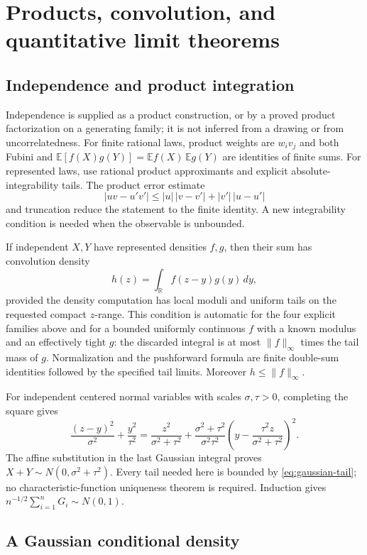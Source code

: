 \section{Products, convolution, and quantitative limit theorems}
\label{sec:limit-theorems}

\subsection{Independence and product integration}

Independence is supplied as a product construction, or by a proved product
factorization on a generating family; it is not inferred from a drawing or
from uncorrelatedness.  For finite rational laws, product weights are
$w_i v_j$ and both Fubini and
$\mathbb E[f(X)g(Y)]=\mathbb E f(X)\,\mathbb E g(Y)$ are identities of
finite sums.  For represented laws, use rational product approximants and
explicit absolute-integrability tails.  The product error estimate
\[
 |uv-u'v'|\leq |u|\,|v-v'|+|v'|\,|u-u'|
\]
and truncation reduce the statement to the finite identity.  A new
integrability condition is needed when the observable is unbounded.

If independent $X,Y$ have represented densities $f,g$, then their sum has
convolution density
\[
 h(z)=\int_{\mathbb R}f(z-y)g(y)\,dy,
\]
provided the density computation has local moduli and uniform tails on the
requested compact $z$-range.  This condition is automatic for the four
explicit families above and for a bounded uniformly continuous $f$ with a
known modulus and an effectively tight $g$: the discarded integral is at
most $\|f\|_\infty$ times the tail mass of $g$.  Normalization and the
pushforward formula are finite double-sum identities followed by the
specified tail limits.  Moreover $h\leq\|f\|_\infty$.

For independent centered normal variables with scales $\sigma,\tau>0$,
completing the square gives
\[
 \frac{(z-y)^2}{\sigma^2}+\frac{y^2}{\tau^2}
 =\frac{z^2}{\sigma^2+\tau^2}
  +\frac{\sigma^2+\tau^2}{\sigma^2\tau^2}
       \left(y-\frac{\tau^2z}{\sigma^2+\tau^2}\right)^2.
\]
The affine substitution in the last Gaussian integral proves
$X+Y\sim N(0,\sigma^2+\tau^2)$.  Every tail needed here is bounded by
\eqref{eq:gaussian-tail}; no characteristic-function uniqueness theorem is
required.  Induction gives
$n^{-1/2}\sum_{i=1}^nG_i\sim N(0,1)$.

\subsection{A Gaussian conditional density}

